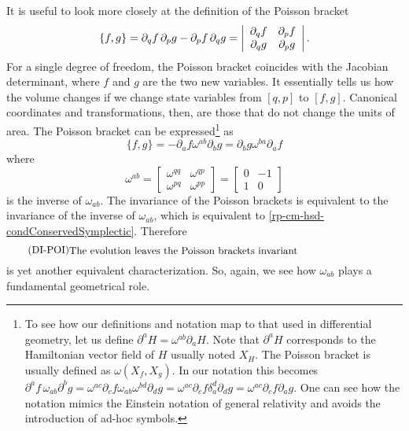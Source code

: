 It is useful to look more closely at the definition of the Poisson bracket
\begin{equation}
	\{f, g\} = \partial_q f \, \partial_p g - \partial_p f \, \partial_q g = \left|\begin{array}{ c c }
		\partial_q f & \partial_p f \\
		\partial_q g & \partial_p g \\
	\end{array} \right|.
\end{equation}
For a single degree of freedom, the Poisson bracket coincides with the Jacobian determinant, where $f$ and $g$ are the two new variables. It essentially tells us how the volume changes if we change state variables from $[q, p]$ to $[f, g]$. Canonical coordinates and transformations, then, are those that do not change the units of area. The Poisson bracket can be expressed\footnote{To see how our definitions and notation map to that used in differential geometry, let us define $\partial^a H = \omega^{ab} \partial_a H$. Note that $\partial^a H$ corresponds to the Hamiltonian vector field of $H$ usually noted $X_H$. The Poisson bracket is usually defined as $\omega(X_f, X_g)$. In our notation this becomes $\partial^a f \, \omega_{ab} \partial^b g = \omega^{ac} \partial_c f \omega_{ab} \omega^{bd} \partial_d g = \omega^{ac} \partial_c f \delta_a^d \partial_d g = \omega^{ac} \partial_c f \partial_a g$. One can see how the notation mimics the Einstein notation of general relativity and avoids the introduction of ad-hoc symbols.} as
\begin{equation}
	\{f, g\} = - \partial_a f \omega^{ab} \partial_b g = \partial_b g \omega^{ba} \partial_a f
\end{equation}
where 
\begin{equation}
	\omega^{ab} = \left[\begin{array}{cc}
		\omega^{qq} & \omega^{qp} \\
		\omega^{pq} & \omega^{pp} 
	\end{array} \right]= \left[\begin{array}{cc}
		0 & -1 \\
		1 & 0 
	\end{array} \right]
\end{equation}
is the inverse of $\omega_{ab}$. The invariance of the Poisson brackets is equivalent to the invariance of the inverse of $\omega_{ab}$, which is equivalent to \ref{rp-cm-hsd-condConservedSymplectic}. Therefore
\begin{equation}\label{rp-cm-hsd-condConservedPoisson}
	\tag{DI-POI}
	\eqtext{The evolution leaves the Poisson brackets invariant}
\end{equation}
is yet another equivalent characterization. So, again, we see how $\omega_{ab}$ plays a fundamental geometrical role.

